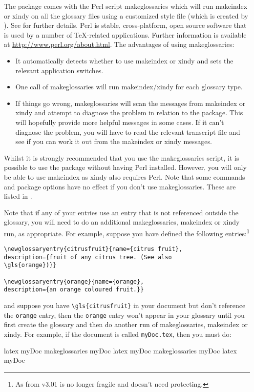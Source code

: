 \documentclass{nlctdoc}
\begin{document}
The  package comes with the Perl script
\gls{makeglossaries} which will run \gls{makeindex} or \gls{xindy}
on all the glossary files using a customized style file (which is
created by ). See
 for further
details. Perl is stable, cross-platform, open source software that
is used by a number of \TeX-related applications. Further
information is available at \url{http://www.perl.org/about.html}.
The advantages of using \gls*{makeglossaries}:
\begin{itemize}
\item It automatically detects whether to use \gls*{makeindex} or
\gls*{xindy} and sets the relevant application switches.

\item One call of \gls*{makeglossaries} will run 
\gls*{makeindex}/\gls*{xindy} for each glossary type.

\item If things go wrong, \gls{makeglossaries} will scan the
messages from \gls{makeindex} or \gls{xindy} and attempt to diagnose
the problem in relation to the  package. This
will hopefully provide more helpful messages in some cases. If it
can't diagnose the problem, you will have to read the relevant transcript
file and see if you can work it out from the \gls*{makeindex} or
\gls*{xindy} messages.

\end{itemize}

Whilst it is strongly recommended that you use the
\gls{makeglossaries} script, it is possible to use the
 package without having Perl installed. However,
you will only be able to use \gls{makeindex} as \gls{xindy} also
requires Perl. Note that some commands and package options have no
effect if you don't use \gls*{makeglossaries}. These are listed in
.

Note that if any of your entries use an entry
that is not referenced outside the glossary, you will need to
do an additional \gls{makeglossaries}, \gls{makeindex}
or \gls{xindy} run, as appropriate. For example,
suppose you have defined the following entries:\footnote{As from
v3.01  is no longer fragile and doesn't need protecting.}
\begin{verbatim}
\newglossaryentry{citrusfruit}{name={citrus fruit},
description={fruit of any citrus tree. (See also 
\gls{orange})}}

\newglossaryentry{orange}{name={orange},
description={an orange coloured fruit.}}
\end{verbatim}
and suppose you have \verb|\gls{citrusfruit}| in your document
but don't reference the \texttt{orange} entry, then the
\texttt{orange} entry won't appear in your glossary until
you first create the glossary and then do another run
of \gls{makeglossaries}, \gls{makeindex} or \gls{xindy}.
For example, if the document is called \texttt{myDoc.tex}, then
you must do:
\begin{prompt}
latex myDoc
makeglossaries myDoc
latex myDoc
makeglossaries myDoc
latex myDoc
\end{prompt}
\end{document}
